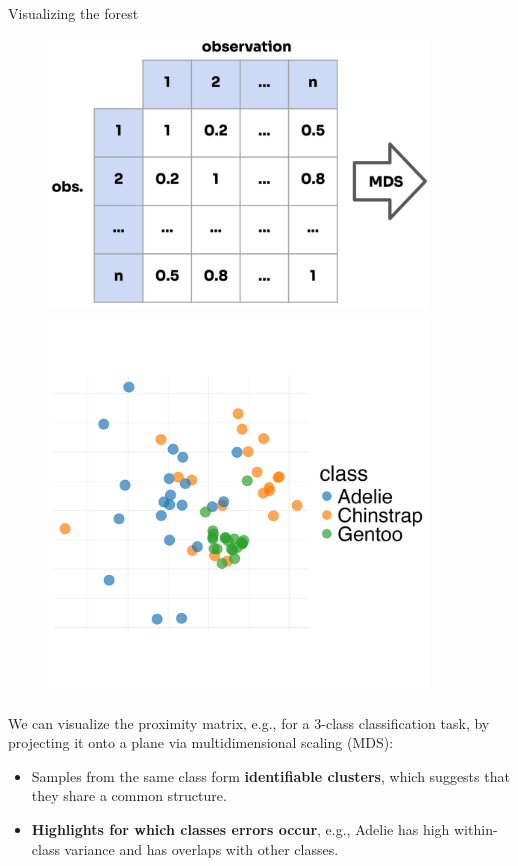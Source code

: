 \documentclass[11pt,compress,t,notes=noshow, xcolor=table]{beamer}
\begin{document}
\begin{vbframe}{Visualizing the forest}

\vspace{-5ex}
\begin{figure}
\centering
\begin{minipage}{.5\textwidth}
  \centering
  \includegraphics[width=0.9\textwidth]{figure_man/forest-prox-matrix.png}
\end{minipage}%
\begin{minipage}{.5\textwidth}
  \centering
  \includegraphics[width=0.9\textwidth]{figure/forest-prox-vis_1.png}
\end{minipage}
\end{figure}
\vspace{-3ex}
We can visualize the proximity matrix, e.g., for a 3-class classification task, by projecting it onto a plane via multidimensional scaling (MDS):
\begin{itemize}
  \item Samples from the same class form \textbf{identifiable clusters}, which suggests that they share a common structure.
  \item \textbf{Highlights for which classes errors occur}, e.g., Adelie has high within-class variance and has overlaps with other classes.
\end{itemize}


\end{vbframe}
\end{document}

